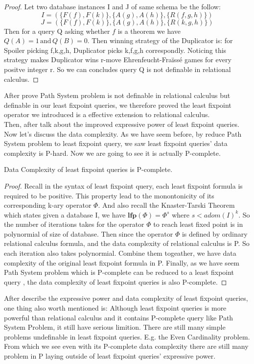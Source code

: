 \begin{proof}
Let two database instances I and J of same schema be the follow:
$$I=(\{F(f), F(k)\}, \{A(g),A(h)\},\{R(f,g,h)\})$$
$$J=(\{F(f), F(k)\}, \{A(g),A(h)\}, \{R(k,g,h)\})$$
Then for a query Q asking whether $f$ is a theorem we have $Q(A)=1 \, \text{and} \, Q(B)=0$. Then winning strategy of the Duplicator is: for Spoiler picking f,k,g,h, Duplicator picks k,f,g,h correspondly. Noticing this strategy makes Duplicator wins r-move Ehrenfeucht-Fra\"iss\'e games for every positve integer r. So we can concludes query Q is not definable in relational calculus.
\end{proof}

After prove Path System problem is not definable in relational calculus but definable in our least fixpoint queries, we therefore proved the least fixpoint operator we introduced is a effective extension to relational calculus.\\

Then, after talk about the improved expressive power of least fixpoint queries. Now let's discuss the data complexity. As we have seem before, by reduce Path System problem to least fixpoint query, we saw least fixpoint queries' data complexity is P-hard. Now we are going to see it is actually P-complete.\\

\begin{claim}
Data Complexity of least fixpoint queries is P-complete.
\end{claim}
\begin{proof}
Recall in the syntax of least fixpoint query, each least fixpoint formula is required to be positive. This property lead to the monontonicity of its corresponding k-ary operator $\Phi$. And also recall the Knaster-Tarski Theorem which states given a database I, we have $\textbf{lfp}(\Phi)=\Phi^s$ where $s<adom(I)^k$. So the number of iterations takes for the operator $\Phi$ to reach least fixed point is in polynormial of size of database. Then since the operator $\Phi$ is defined by ordinary relational calculus formula, and the data complexity of relational calculus is P. So each iteration also takes polynormial. Combine them togeather, we have data complexity of the original least fixpoint formula in P. Finally, as we have seem Path System problem which is P-complete can be reduced to a least fixpoint query , the data complexity of least fixpoint queries is also P-complete. 
\end{proof}

After describe the expressive power and data complexity of least fixpoint queries, one thing also worth mentioned is: Although least fixpoint queries is more powerful than relational calculus and it contains P-complete query like Path System Problem, it still have serious limition. There are still many simple problems undefinable in least fixpoint queries. E.g. the Even Cardinality problem\cite{kolaitis1}. From which we see even with its P-complete data complexity there are still many problem in P laying outside of least fixpoint queries' expressive power.



